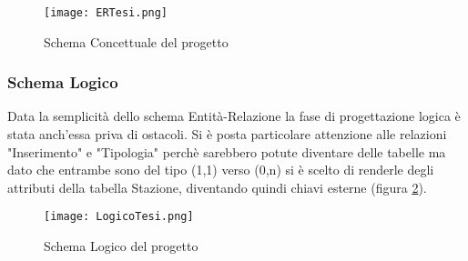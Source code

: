 \begin{figure}[ht!]
    \centering
    {\texttt{[image: ERTesi.png]}}
    \caption{Schema Concettuale del progetto}
    \label{schemaEr}
\end{figure} 

\subsubsection{Schema Logico}
Data la semplicità dello schema Entità-Relazione la fase di progettazione logica
è stata anch'essa priva di ostacoli. Si è posta particolare attenzione alle
relazioni "Inserimento" e "Tipologia" perchè sarebbero potute diventare delle
tabelle ma dato che entrambe sono del tipo (1,1) verso (0,n) si è scelto di
renderle degli attributi della tabella Stazione, diventando quindi chiavi
esterne (figura \ref{schemaLogico}). 

\begin{figure}[ht!]
    \centering
    {\texttt{[image: LogicoTesi.png]}}
    \caption{Schema Logico del progetto}
    \label{schemaLogico}
\end{figure} 

